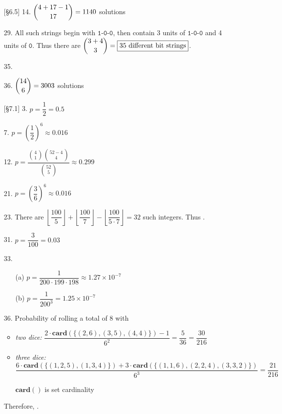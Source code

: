 \documentclass{article}
\begin{document}

\begin{enumerate}
    \item[{[\S 6.5]} 14.] $\dbinom{4+17-1}{17} = 1140$ solutions
    \item[29.] All such strings begin with $\texttt{1-0-0}$, then contain 3 units of $\texttt{1-0-0}$ and 4 units of $\texttt{0}$. Thus there are $\dbinom{3+4}{3} = \fbox{35 different bit strings}$.
    \item[35.] %
    \item[36.] $\dbinom{14}{6} = 3003$ solutions
    \item[{[\S 7.1]} 3.] $p = \dfrac{1}{2} = 0.5$
    \item[7.] $p = \left( \dfrac{1}{2} \right)^6 \approx 0.016$
    \item[12.] $p = \dfrac{\binom{4}{1} \binom{52-4}{4}}{\binom{52}{5}} \approx 0.299$
    \item[21.] $p = \left( \dfrac{3}{6} \right)^6 \approx 0.016$
    \item[23.] There are $\left\lfloor\dfrac{100}{5}\right\rfloor + \left\lfloor\dfrac{100}{7}\right\rfloor - \left\lfloor\dfrac{100}{5\cdot 7}\right\rfloor = 32$ such integers. Thus .
    \item[31.] $p = \dfrac{3}{100} = 0.03$
    \item[33.]
        \begin{itemize}
            \item[(a)] $p = \dfrac{1}{200 \cdot 199 \cdot 198} \approx 1.27 \times 10^{-7}$
            \item[(b)] $p = \dfrac{1}{200^3} = 1.25 \times 10^{-7}$
        \end{itemize}
    \item[36.] Probability of rolling a total of 8 with
        \begin{itemize}
            \item \textit{two dice:} $\dfrac{ 2 \cdot \mathbf{card}(\{ (2,6), (3,5), (4,4) \}) - 1}{6^2} = \dfrac{5}{36} = \dfrac{30}{216}$
            \item \textit{three dice:} $\dfrac{6 \cdot \mathbf{card}( \{ (1,2,5), (1,3,4) \} ) + 3 \cdot \mathbf{card}( \{ (1,1,6), (2,2,4), (3,3,2) \} )}{6^3} = \dfrac{21}{216}$
            \begin{flushright}
            \small{$\mathbf{card}()$ is set cardinality}
            \end{flushright}
        \end{itemize}

    Therefore, .
\end{enumerate}
\end{document}
